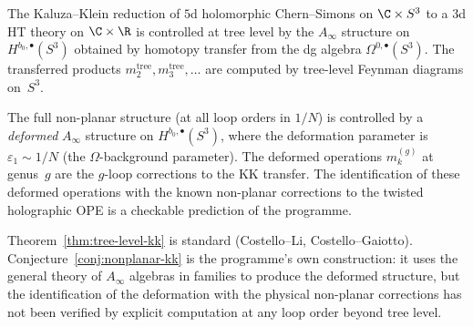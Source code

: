 \begin{theorem}
\label{thm:tree-level-kk}
The Kaluza--Klein reduction of $5$d holomorphic Chern--Simons on
$\C \times S^3$ to a $3$d HT theory on $\C \times \R$ is
controlled at tree level by the $A_\infty$ structure on
$H^{b_0, \bullet}(S^3)$ obtained by homotopy transfer from the dg
algebra $\Omega^{0,\bullet}(S^3)$.  The transferred products
$m_2^{\mathrm{tree}}, m_3^{\mathrm{tree}}, \ldots$ are computed by
tree-level Feynman diagrams on~$S^3$.
\end{theorem}

\begin{conjecture}
\label{conj:nonplanar-kk}
The full non-planar structure \textup{(}at all loop orders in
$1/N$\textup{)} is controlled by a \emph{deformed} $A_\infty$
structure on $H^{b_0, \bullet}(S^3)$, where the deformation
parameter is $\varepsilon_1 \sim 1/N$
\textup{(}the $\Omega$-background parameter\textup{)}.  The
deformed operations $m_k^{(g)}$ at genus~$g$ are the $g$-loop
corrections to the KK transfer.  The identification of these
deformed operations with the known non-planar corrections to the
twisted holographic OPE is a checkable prediction of the
programme.
\end{conjecture}

\begin{remark}[Scope]
\label{rem:kk-transfer-scope}
Theorem~\ref{thm:tree-level-kk} is standard
\textup{(}Costello--Li, Costello--Gaiotto\textup{)}.
Conjecture~\ref{conj:nonplanar-kk} is the programme's own
construction: it uses the general theory of $A_\infty$ algebras
in families to produce the deformed structure, but the
identification of the deformation with the physical non-planar
corrections has not been verified by explicit computation at any
loop order beyond tree level.
\end{remark}
